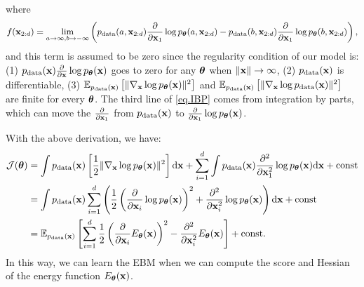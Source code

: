 \documentclass{article}
\begin{document}
where 
$$
f({\mathbf{x}}_{2:d}) = \lim_{a\to\infty, b\to-\infty}\left( p_{\rm{data}}(a,{\mathbf{x}}_{2:d})\frac{\partial}{\partial {\mathbf{x}}_1}\log p_{\bm{\theta}}(a, {\mathbf{x}}_{2:d}) - p_{\rm{data}}(b,{\mathbf{x}}_{2:d})\frac{\partial}{\partial {\mathbf{x}}_1}\log p_{\bm{\theta}}(b,{\mathbf{x}}_{2:d})\right),
$$
and this term is assumed to be zero since the regularity condition of our model is: (1) $p_{\rm{data}}({\mathbf{x}})\frac{\partial}{\partial {\mathbf{x}}}\log p_{\bm{\theta}}({\mathbf{x}})$ goes to zero for any ${\bm{\theta}}$ when $\|{\mathbf{x}}\| \to \infty$, (2) $p_{\rm{data}}({\mathbf{x}})$ is differentiable, (3) $\mathbb{E}_{p_{\rm{data}}({\mathbf{x}})}\left[ \| \nabla_{\mathbf{x}} \log p_{\bm{\theta}}({\mathbf{x}}) \|^2 \right]$ and $\mathbb{E}_{p_{\rm{data}}({\mathbf{x}})}\left[ \| \nabla_{\mathbf{x}} \log p_{\rm{data}}({\mathbf{x}}) \|^2 \right]$ are finite for every ${\bm{\theta}}$. The third line of \eqref{eq.IBP} comes from integration by parts, which can move the $\frac{\partial}{\partial {\mathbf{x}}_1}$ from $p_{\rm{data}}({\mathbf{x}})$ to $\frac{\partial}{\partial {\mathbf{x}}_1}\log p_{\bm{\theta}}({\mathbf{x}})$.

With the above derivation, we have:
\begin{equation}\label{eq.BSM}
    \begin{aligned}
        \mathcal{J}({\bm{\theta}})
        &= \int p_{\rm{data}}({\mathbf{x}})\left[ \frac{1}{2} \| \nabla_{\mathbf{x}}\log p_{\bm{\theta}}({\mathbf{x}}) \|^2 \right] \mathrm{d}{\mathbf{x}} + \sum_{i=1}^d\int p_{\rm{data}}({\mathbf{x}})\frac{\partial^2}{\partial {\mathbf{x}}_1^2}\log p_{\bm{\theta}}({\mathbf{x}})\mathrm{d}{\mathbf{x}} + \text{const} \\
        &= \int p_{\rm{data}}({\mathbf{x}})\sum_{i=1}^d \left( \frac{1}{2}\left( \frac{\partial}{\partial {\mathbf{x}}_i}\log p_{\bm{\theta}}({\mathbf{x}}) \right)^2 + \frac{\partial^2}{\partial {\mathbf{x}}_i^2}\log p_{\bm{\theta}}({\mathbf{x}}) \right)\mathrm{d}{\mathbf{x}} + \text{const} \\
        &= \mathbb{E}_{p_{\rm{data}}({\mathbf{x}})}\left[ \sum_{i=1}^d\frac{1}{2}\left( \frac{\partial}{\partial {\mathbf{x}}_i}E_{\bm{\theta}}({\mathbf{x}}) \right)^2 - \frac{\partial^2}{\partial {\mathbf{x}}_i^2}E_{\bm{\theta}}({\mathbf{x}})\right] + \text{const}.
    \end{aligned}
\end{equation}
In this way, we can learn the EBM when we can compute the score and Hessian of the energy function $E_{\bm{\theta}}({\mathbf{x}})$.
\end{document}
